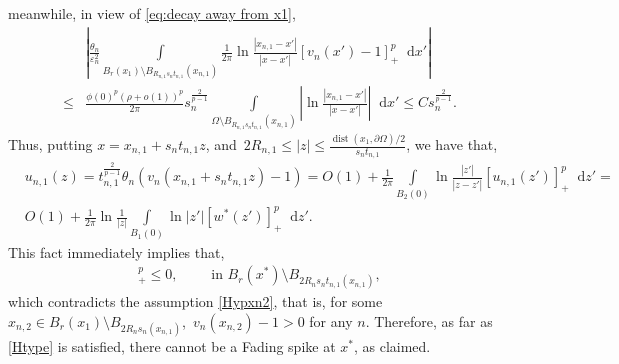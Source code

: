 \documentclass[10pt]{amsart}
\newcommand{\dd}{\mathop{}\!\mathrm{d}}
\newcommand{\eps}{\varepsilon}
\newcommand{\p}{\partial}
\DeclareMathOperator{\dist}{dist}
\begin{document}
    meanwhile, in view of \eqref{eq:decay away from x1},
    \begin{align*}
        & \left| \frac{\theta_n}{\eps_n^2} \int\limits_{B_r(x_1)\setminus B_{R_{n,1} s_n t_{n,1}}(x_{n,1}) } \frac{1}{2\pi}\ln\frac{|x_{n,1}-x'|}{|x-x'|} [v_n(x')-1]_+^p\dd{x'}\right| \\
        \leq& \frac{\phi(0)^p(\rho+o(1))^p}{2\pi} s_n^{\frac{2}{p-1}} \int\limits_{\Omega\setminus B_{R_{n,1}s_n t_{n,1}}(x_{n,1})} \left|\ln\frac{|x_{n,1} -x'| }{|x-x'|} \right|\dd{x'}
        \leq C s_n^{\frac{2}{p-1}}.
    \end{align*}
    Thus, putting $x=x_{n,1}+s_n t_{n,1}z$, and~$ 2R_{n,1}  \leq |z| \leq \frac{\dist(x_1,\p\Omega)/2}{s_n t_{n,1}}$, we have that,
    \begin{align*}
        &u_{n,1}(z)=t_{n,1}^{\frac{2}{p-1}}\theta_n(v_n(x_{n,1}+ s_n t_{n,1} z)-1)
        = O(1)+\frac{1}{2\pi} \int\limits_{B_2 (0)} \ln \frac{|z'|}{|z - z' | } [u_{n,1}(z')]_+^p\dd z' =\\
        & O(1)+ \frac{1}{2\pi}\ln\frac{1}{|z|} \int\limits_{B_1(0)} \ln|z'| [w^*(z')]_+^p\dd{z'}.
    \end{align*}
    This fact immediately implies that,
    \begin{align*}
        [v_n(x)-1]_+^p \leq 0, \qquad \mbox{ in } B_r(x^*)\setminus B_{2R_n s_n t_{n,1}(x_{n,1})},
    \end{align*}
    which contradicts the assumption \eqref{Hypxn2}, that is, for some~$x_{n,2}\in B_r(x_1)\setminus B_{2R_n s_n(x_{n,1})}$,~$v_n(x_{n,2})-1>0$ for any $n$.
    Therefore, as far as \eqref{Htype} is satisfied, there cannot be a Fading spike at $x^*$, as claimed.
\end{document}
